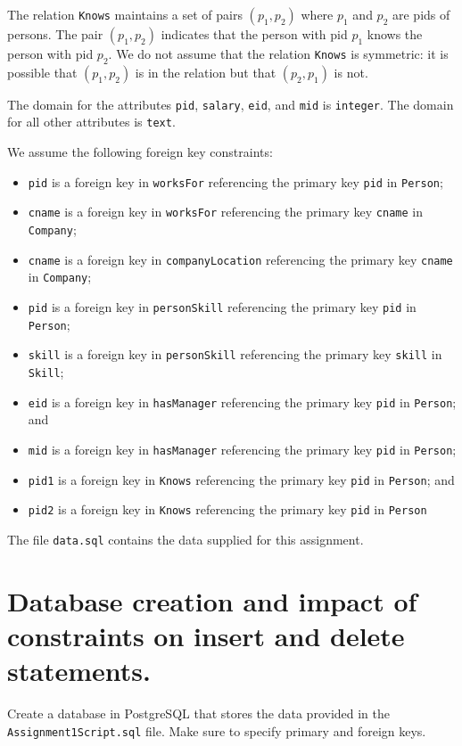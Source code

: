 \documentclass{article}
\begin{document}
The relation {\tt Knows} maintains a set of pairs $(p_1,p_2)$ 
where $p_1$ 
and $p_2$ are pids of persons.   The pair $(p_1,p_2)$ indicates 
that the person with
pid $p_1$ knows the person with pid $p_2$.
We do not assume that the relation {\tt Knows} is
symmetric: it is possible that $(p_1,p_2)$ is in the relation but that $(p_2,p_1)$ is not.

The domain for the attributes {\tt pid}, {\tt salary}, {\tt eid}, and {\tt mid} is {\tt integer}.   The domain for all other attributes is {\tt text}.

We assume the following foreign key constraints:
\begin{itemize}
\item {\tt pid} is a foreign key in {\tt worksFor} referencing the primary key {\tt pid} in {\tt Person};
\item {\tt cname} is a foreign key in {\tt worksFor} referencing the primary key {\tt cname} in {\tt Company};
\item {\tt cname} is a foreign key in {\tt companyLocation} referencing the primary key {\tt cname} in {\tt Company};
\item {\tt pid} is a foreign key in {\tt personSkill} referencing the primary key {\tt pid} in {\tt Person};
\item {\tt skill} is a foreign key in {\tt personSkill} referencing the primary key {\tt skill} in {\tt Skill};
\item {\tt eid} is a foreign key in {\tt hasManager} referencing the primary key {\tt pid} in {\tt Person}; and
\item {\tt mid} is a foreign key in {\tt hasManager} referencing the primary key {\tt pid} in {\tt Person};
\item {\tt pid1} is a foreign key in {\tt Knows} referencing the 
primary key {\tt pid} in {\tt Person}; and
\item {\tt pid2} is a foreign key in {\tt Knows} referencing the 
primary key {\tt pid} in {\tt Person}

\end{itemize}

The file {\tt data.sql} contains the data supplied for this assignment.

\newpage
\section{Database creation and impact of constraints on insert and delete statements.}

Create a database in PostgreSQL that stores the data provided in the \\{\tt Assignment1Script.sql} file. Make sure to specify primary and foreign keys. 
\end{document}
